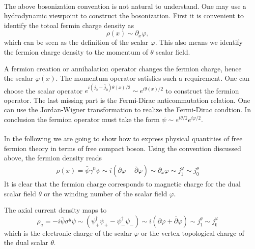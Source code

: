  \\
The above bosonization convention is not natural to understand. One may use a hydrodynamic viewpoint to construct the bosonization. First it is convenient to identify the totoal fermin charge density as 
\begin{equation}
	\rho(x) \sim \partial_x \varphi,
\end{equation}
which can be seen as the definition of the scalar $\varphi$. This also means we identify the fermion charge density to the momentum of $\theta$ scalar field. 

A fermion creation or annihalation operator changes the fermion charge, hence the scalar $\varphi(x)$. The momentum operator satisfies such a requirement. One can choose the scalar operator $e^{i (j_0 - \bar{j}_0) \theta(x)/2} \sim e^{i \theta(x)/2}$ to construct the fermion operator. The last missing part is the Fermi-Dirac anticommutation relation. One can use the Jordan-Wigner transformation to realize the Fermi-Dirac condtion. In conclusion the fermion operator must take the form $\psi \sim e^{i\theta/2} e^{i\varphi/2}$.
\\

 \\
In the following we are going to show how to express physical quantities of free fermion theory in terms of free compact boson. Using the convention discussed above, the fermion density reads
\begin{equation}
	\begin{aligned}
		\rho(x) = \bar{\psi} \gamma^0 \psi \sim i \left(\partial \varphi - \bar{\partial} \varphi\right) \sim \partial_x \varphi \sim j_1^\varphi \sim j_0^\theta  
	\end{aligned}
\end{equation}
It is clear that the fermion charge corresponds to magnetic charge for the dual scalar field $\theta$ or the winding number of the scalar field $\varphi$. 

The axial current density maps to 
\begin{equation}
	\rho_a = -i \bar{\psi} \sigma^y \psi \sim \left( \psi^{\dagger}_{+} \psi_{+} - \psi^{\dagger}_{-}\psi_{-} \right) \sim i \left(\partial \varphi + \bar{\partial} \varphi\right) \sim j_1^\theta \sim j_0^\varphi
\end{equation}
which is the electronic charge of the scalar $\varphi$ or the vertex topological charge of the dual scalar $\theta$. 

